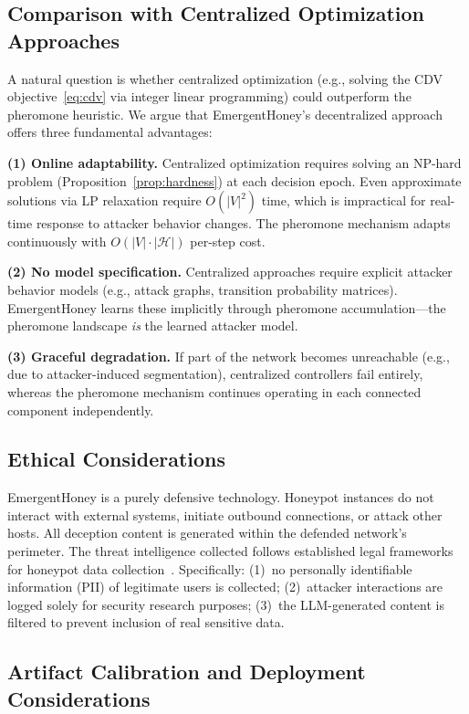 \documentclass[review,3p,twocolumn]{elsarticle}
\newcommand{\calH}{\mathcal{H}}
\begin{document}
\subsection{Comparison with Centralized Optimization Approaches}

A natural question is whether centralized optimization (e.g., solving the CDV objective~\eqref{eq:cdv} via integer linear programming) could outperform the pheromone heuristic. We argue that EmergentHoney's decentralized approach offers three fundamental advantages:

\textbf{(1) Online adaptability.} Centralized optimization requires solving an NP-hard problem (Proposition~\ref{prop:hardness}) at each decision epoch. Even approximate solutions via LP relaxation require $O(|V|^2)$ time, which is impractical for real-time response to attacker behavior changes. The pheromone mechanism adapts continuously with $O(|V| \cdot |\calH|)$ per-step cost.

\textbf{(2) No model specification.} Centralized approaches require explicit attacker behavior models (e.g., attack graphs, transition probability matrices). EmergentHoney learns these implicitly through pheromone accumulation---the pheromone landscape \emph{is} the learned attacker model.

\textbf{(3) Graceful degradation.} If part of the network becomes unreachable (e.g., due to attacker-induced segmentation), centralized controllers fail entirely, whereas the pheromone mechanism continues operating in each connected component independently.

\subsection{Ethical Considerations}

EmergentHoney is a purely defensive technology. Honeypot instances do not interact with external systems, initiate outbound connections, or attack other hosts. All deception content is generated within the defended network's perimeter. The threat intelligence collected follows established legal frameworks for honeypot data collection~\cite{sokol2018legal}. Specifically: (1)~no personally identifiable information (PII) of legitimate users is collected; (2)~attacker interactions are logged solely for security research purposes; (3)~the LLM-generated content is filtered to prevent inclusion of real sensitive data.

\subsection{Artifact Calibration and Deployment Considerations}
\end{document}

